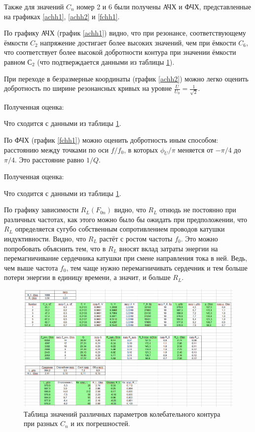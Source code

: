\documentclass[a4paper,12pt]{article}
\begin{document}
Также для значений $C_n$ номер 2 и 6 были получены АЧХ и ФЧХ, представленные на графиках \ref{achh1}, \ref{achh2} и \ref{fchh1}.

По графику АЧХ (график \ref{achh1}) видно, что при резонансе, соответствующему ёмкости $C_2$ напряжение достигает более высоких значений, чем при ёмкости $C_6$, что соответствует более высокой добротности контура при значении ёмкости равном $С_2$ (что подтверждается данными из таблицы \ref{table1}).
 
При переходе в безразмерные координаты (график \ref{achh2}) можно легко оценить добротность по ширине резонансных кривых на уровне $\frac{U}{U_0} = \frac{1}{\sqrt{2}}$.

\bigskip
Полученная оценка: 

\bigskip

Что сходится с данными из таблицы \ref{table1}.

По ФЧХ (график \ref{fchh1}) можно оценить добротность иным способом: расстоянию между точками по оси $f/f_0$, в которых $\phi_U/\pi$ меняется от $-\pi/4$ до $\pi/4$. Это расстояние равно $1/Q$.

\bigskip
Полученная оценка:

\bigskip

Что сходится с данными из таблицы \ref{table1}.

\bigskip

\bigskip

\bigskip

По графику зависимости $R_L(F_{0n})$ видно, что $R_L$ отнюдь не постоянно при различных частотах, как этого можно было бы ожидать при предположении, что $R_L$ определяется сугубо собственным сопротивлением проводов катушки индуктивности. Видно, что $R_L$ растёт с ростом частоты $f_0$. Это можно попробовать объяснить тем, что в $R_L$ вносят вклад затраты энергии на перемагничивание сердечника катушки при смене направления тока в ней. Ведь, чем выше частота $f_0$, тем чаще нужно перемагничивать сердечник и тем больше потери энергии в единицу времени, а значит, и больше $R_L$.





\begin{figure}
\centering
\includegraphics[width=220mm]{table_final.png}
\caption{Таблица значений различных параметров колебательного контура при разных $C_n$ и их погрешностей.}\label{table1}
\end{figure}
\end{document}
